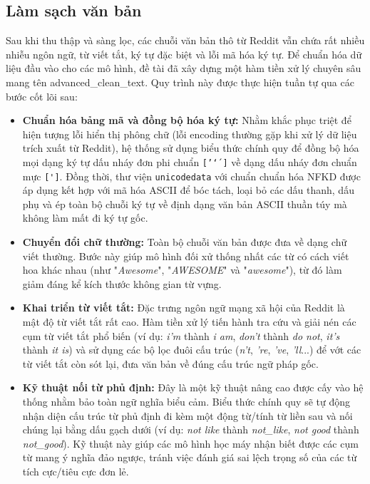 \subsection{Làm sạch văn bản}

Sau khi thu thập và sàng lọc, các chuỗi văn bản thô từ Reddit vẫn chứa rất nhiều nhiễu ngôn ngữ, từ viết tắt, ký tự đặc biệt và lỗi mã hóa ký tự. Để chuẩn hóa dữ liệu đầu vào cho các mô hình, đề tài đã xây dựng một hàm tiền xử lý chuyên sâu mang tên advanced\_clean\_text. Quy trình này được thực hiện tuần tự qua các bước cốt lõi sau:
\begin{itemize}
	\item \textbf{Chuẩn hóa bảng mã và đồng bộ hóa ký tự:} Nhằm khắc phục triệt để hiện tượng lỗi hiển thị phông chữ (lỗi encoding thường gặp khi xử lý dữ liệu trích xuất từ Reddit), hệ thống sử dụng biểu thức chính quy để đồng bộ hóa mọi dạng ký tự dấu nháy đơn phi chuẩn \verb|[’‘´]| về dạng dấu nháy đơn chuẩn mực \verb|[']|. Đồng thời, thư viện \texttt{unicodedata} với chuẩn chuẩn hóa NFKD được áp dụng kết hợp với mã hóa ASCII để bóc tách, loại bỏ các dấu thanh, dấu phụ và ép toàn bộ chuỗi ký tự về định dạng văn bản ASCII thuần túy mà không làm mất đi ký tự gốc. 
	
	\item \textbf{Chuyển đổi chữ thường:} Toàn bộ chuỗi văn bản được đưa về dạng chữ viết thường. Bước này giúp mô hình đối xử thống nhất các từ có cách viết hoa khác nhau (như "\textit{Awesome}", "\textit{AWESOME}" và "\textit{awesome}"), từ đó làm giảm đáng kể kích thước không gian từ vựng.
	
	\item \textbf{Khai triển từ viết tắt:} Đặc trưng ngôn ngữ mạng xã hội của Reddit là mật độ từ viết tắt rất cao. Hàm tiền xử lý tiến hành tra cứu và giải nén các cụm từ viết tắt phổ biến (ví dụ: \textit{i'm} thành \textit{i am}, \textit{don't} thành \textit{do not}, \textit{it's} thành \textit{it is}) và sử dụng các bộ lọc đuôi cấu trúc (\textit{n't}, \textit{'re}, \textit{'ve}, \textit{'ll}...) để vớt các từ viết tắt còn sót lại, đưa văn bản về đúng cấu trúc ngữ pháp gốc.
	
	\item \textbf{Kỹ thuật nối từ phủ định:} Đây là một kỹ thuật nâng cao được cấy vào hệ thống nhằm bảo toàn ngữ nghĩa biểu cảm. Biểu thức chính quy sẽ tự động nhận diện cấu trúc từ phủ định đi kèm một động từ/tính từ liền sau và nối chúng lại bằng dấu gạch dưới (ví dụ: \textit{not like} thành \textit{not\_like}, \textit{not good} thành \textit{not\_good}). Kỹ thuật này giúp các mô hình học máy nhận biết được các cụm từ mang ý nghĩa đảo ngược, tránh việc đánh giá sai lệch trọng số của các từ tích cực/tiêu cực đơn lẻ.
	

\end{itemize}
